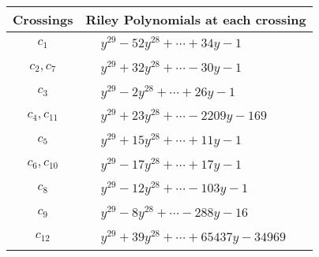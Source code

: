 \documentclass[1p]{elsarticle_modified}
\theoremstyle{definition}
\begin{document}
\begin{tabular}{m{50pt}|m{274pt}}
Crossings & \hspace{64pt}Riley Polynomials at each crossing \\
\hline $$\begin{aligned}c_{1}\end{aligned}$$&$\begin{aligned}
&y^{29}-52 y^{28}+\cdots+34 y-1
\end{aligned}$\\
\hline $$\begin{aligned}c_{2},c_{7}\end{aligned}$$&$\begin{aligned}
&y^{29}+32 y^{28}+\cdots-30 y-1
\end{aligned}$\\
\hline $$\begin{aligned}c_{3}\end{aligned}$$&$\begin{aligned}
&y^{29}-2 y^{28}+\cdots+26 y-1
\end{aligned}$\\
\hline $$\begin{aligned}c_{4},c_{11}\end{aligned}$$&$\begin{aligned}
&y^{29}+23 y^{28}+\cdots-2209 y-169
\end{aligned}$\\
\hline $$\begin{aligned}c_{5}\end{aligned}$$&$\begin{aligned}
&y^{29}+15 y^{28}+\cdots+11 y-1
\end{aligned}$\\
\hline $$\begin{aligned}c_{6},c_{10}\end{aligned}$$&$\begin{aligned}
&y^{29}-17 y^{28}+\cdots+17 y-1
\end{aligned}$\\
\hline $$\begin{aligned}c_{8}\end{aligned}$$&$\begin{aligned}
&y^{29}-12 y^{28}+\cdots-103 y-1
\end{aligned}$\\
\hline $$\begin{aligned}c_{9}\end{aligned}$$&$\begin{aligned}
&y^{29}-8 y^{28}+\cdots-288 y-16
\end{aligned}$\\
\hline $$\begin{aligned}c_{12}\end{aligned}$$&$\begin{aligned}
&y^{29}+39 y^{28}+\cdots+65437 y-34969
\end{aligned}$\\
\hline
\end{tabular}\\~\\
\end{document}
